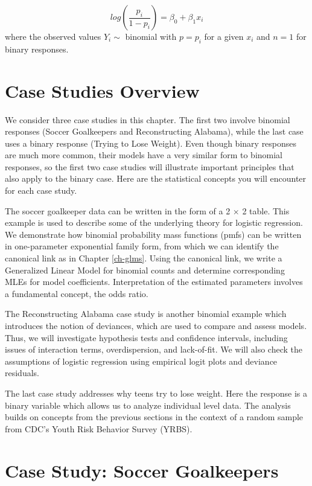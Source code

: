 \documentclass[
]{krantz}
\begin{document}
\begin{equation*}
log(\frac{p_i}{1-p_i})=\beta_0+\beta_1 x_i
\end{equation*}
where the observed values \(Y_i \sim\) binomial with \(p=p_i\) for a given \(x_i\) and \(n=1\) for binary responses.

\section{Case Studies Overview}\label{case-studies-overview-1}

We consider three case studies in this chapter. The first two involve binomial responses (Soccer Goalkeepers and Reconstructing Alabama), while the last case uses a binary response (Trying to Lose Weight). Even though binary responses are much more common, their models have a very similar form to binomial responses, so the first two case studies will illustrate important principles that also apply to the binary case. Here are the statistical concepts you will encounter for each case study.

The soccer goalkeeper data can be written in the form of a 2 \(\times\) 2 table. This example is used to describe some of the underlying theory for logistic regression. We demonstrate how binomial probability mass functions (pmfs) can be written in one-parameter exponential family form, from which we can identify the canonical link as in Chapter \ref{ch-glms}. Using the canonical link, we write a Generalized Linear Model for binomial counts and determine corresponding MLEs for model coefficients. Interpretation of the estimated parameters involves a fundamental concept, the odds ratio.

The Reconstructing Alabama case study is another binomial example which introduces the notion of deviances, which are used to compare and assess models. Thus, we will investigate hypothesis tests and confidence intervals, including issues of interaction terms, overdispersion, and lack-of-fit. We will also check the assumptions of logistic regression using empirical logit plots and deviance residuals.

The last case study addresses why teens try to lose weight. Here the response is a binary variable which allows us to analyze individual level data. The analysis builds on concepts from the previous sections in the context of a random sample from CDC's Youth Risk Behavior Survey (YRBS).

\section{Case Study: Soccer Goalkeepers}\label{case-study-soccer-goalkeepers}
\end{document}
